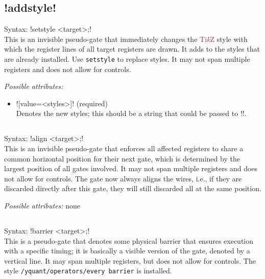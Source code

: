 \documentclass{scrartcl}
\def\TikZ{\textcolor{brown}{Ti\textit kZ}}
\def\ttlink{\link\texttt}
\def\yquantlink{\link\yquant}
\begin{document}
      \subsection[\texorpdfstring{\yquant{addstyle}}{addstyle}]{\yquant!addstyle!}
         Syntax: \yquant!setstyle <target>;! \\
         This is an invisible pseudo\hyp gate that immediately changes the \TikZ{} style with which the register lines of all target registers are drawn.
         It adds to the styles that are already installed.
         Use \ttlink{setstyle} to replace styles.
         It may not span multiple registers and does not allow for controls.

         \emph{Possible attributes:}
         \begin{itemize}
            \item \yquant![value=<styles>]! (required) \\
               Denotes the new styles; this should be a string that could be passed to \tex!\tikzset!.
         \end{itemize}

      \subsection{\texorpdfstring{}{align}}
         Syntax: \yquant!align <target>;! \\
         This is an invisible pseudo\hyp gate that enforces all affected registers to share a common horizontal position for their next gate, which is determined by the largest position of all gates involved.
         It may not span multiple registers and does not allow for controls.
         The gate now always aligns the wires, i.e., if they are discarded directly after this gate, they will still discarded all at the same position.

         \emph{Possible attributes:} none

      \subsection{\texorpdfstring{}{barrier}}
         Syntax: \yquant!barrier <target>;! \\
         This is a pseudo\hyp gate that denotes some physical barrier that ensures execution with a specific timing; it is basically a visible version of the \yquantlink{align} gate, denoted by a vertical line.
         It may span multiple registers, but does not allow for controls.
         The style \ttlink{/yquant/operators/every barrier} is installed.
\end{document}
